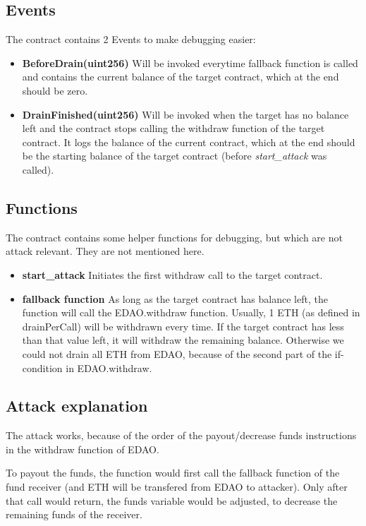 \documentclass[12pt,a4paper]{article}
\begin{document}
\subsection*{Events}
The contract contains 2 Events to make debugging easier:
\begin{itemize}
\item \textbf{BeforeDrain(uint256)} Will be invoked everytime fallback function is
called and contains the current balance of the target contract, which at the end should be zero.
\item \textbf{DrainFinished(uint256)} Will be invoked when the target has no balance left
and the contract stops calling the withdraw function of the target contract. It logs
the balance of the current contract, which at the end should be the starting balance of the target contract (before \textit{start\_attack} was called).
\end{itemize}

\subsection*{Functions}
The contract contains some helper functions for debugging, but which are not attack relevant. They are not mentioned here.
\begin{itemize}
\item \textbf{start\_attack} Initiates the first withdraw call to the target contract.
\item \textbf{fallback function} As long as the target contract has balance left, the function will call the EDAO.withdraw function.
Usually, 1 ETH (as defined in drainPerCall) will be withdrawn every time.
If the target contract has less than that value left, it will withdraw the remaining balance.
Otherwise we could not drain all ETH from EDAO, because of the second part of the if-condition in EDAO.withdraw.
\end{itemize}

\subsection*{Attack explanation}
The attack works, because of the order of the payout/decrease funds instructions in the withdraw function of EDAO.

To payout the funds, the function would first call the fallback function of the fund receiver (and ETH will be transfered from EDAO to attacker).
Only after that call would return, the funds variable would be adjusted, to decrease the remaining funds of the receiver.
\end{document}
